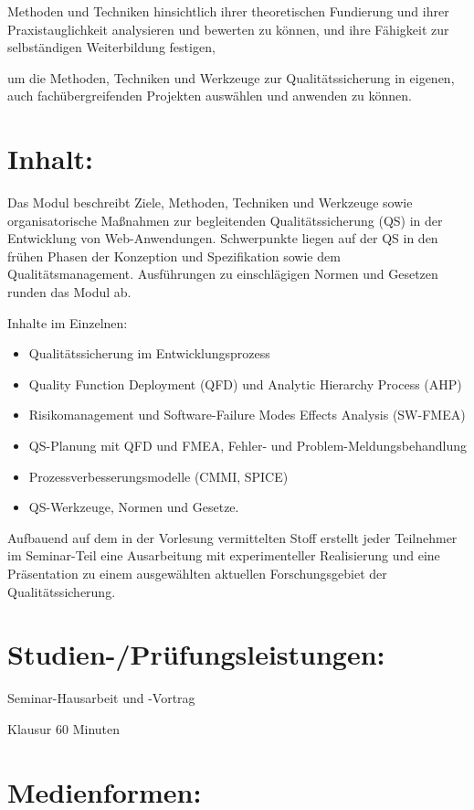 Methoden und Techniken hinsichtlich ihrer theoretischen Fundierung und
ihrer Praxistauglichkeit analysieren und bewerten zu können, und ihre
Fähigkeit zur selbständigen Weiterbildung festigen,

um die Methoden, Techniken und Werkzeuge zur Qualitätssicherung in
eigenen, auch fachübergreifenden Projekten auswählen und anwenden zu
können.

\section*{Inhalt:}\label{inhalt-21}

Das Modul beschreibt Ziele, Methoden, Techniken und Werkzeuge sowie
organisatorische Maßnahmen zur begleitenden Qualitätssicherung (QS) in
der Entwicklung von Web-Anwendungen. Schwerpunkte liegen auf der QS in
den frühen Phasen der Konzeption und Spezifikation sowie dem
Qualitätsmanagement. Ausführungen zu einschlägigen Normen und Gesetzen
runden das Modul ab.

Inhalte im Einzelnen:

\begin{itemize}
\tightlist
\item
  Qualitätssicherung im Entwicklungsprozess
\item
  Quality Function Deployment (QFD) und Analytic Hierarchy Process (AHP)
\item
  Risikomanagement und Software-Failure Modes Effects Analysis (SW-FMEA)
\item
  QS-Planung mit QFD und FMEA, Fehler- und Problem-Meldungsbehandlung
\item
  Prozessverbesserungsmodelle (CMMI, SPICE)
\item
  QS-Werkzeuge, Normen und Gesetze.
\end{itemize}

Aufbauend auf dem in der Vorlesung vermittelten Stoff erstellt jeder
Teilnehmer im Seminar-Teil eine Ausarbeitung mit experimenteller
Realisierung und eine Präsentation zu einem ausgewählten aktuellen
Forschungsgebiet der Qualitätssicherung.

\section*{Studien-/Prüfungsleistungen:}\label{studien-pruxfcfungsleistungen-21}

Seminar-Hausarbeit und -Vortrag

Klausur 60 Minuten

\section*{Medienformen:}\label{medienformen-21}

